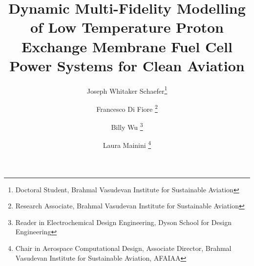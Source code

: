 \title{Dynamic Multi-Fidelity Modelling of Low Temperature Proton Exchange Membrane Fuel Cell Power Systems for Clean Aviation}

\author{Joseph Whitaker Schaefer\footnote{Doctoral Student, Brahmal Vasudevan Institute for Sustainable Aviation}}
\author{Francesco Di Fiore \footnote{Research Associate, Brahmal Vasudevan Institute for Sustainable Aviation}}
\author{Billy Wu \footnote{ Reader in Electrochemical Design Engineering, Dyson School for Design Engineering}}
\author{Laura Mainini \footnote{Chair in Aerospace Computational Design, Associate Director, Brahmal Vasudevan Institute for Sustainable Aviation, AFAIAA}}

